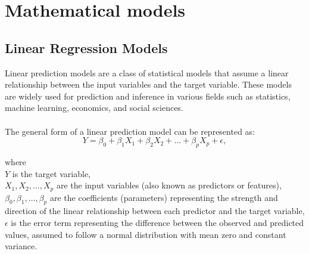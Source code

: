\documentclass[12pt]{article}
\begin{document}
\section{Mathematical models}

\subsection{Linear Regression Models}

Linear prediction models are a class of statistical models that assume
 a linear relationship between the input variables and the target
 variable. These models are widely used for prediction and inference
 in various fields such as statistics, machine learning,
 economics, and social sciences.\\
\\
The general form of a linear prediction model can be represented as:\\

\begin{equation}\label{eq1}
    Y = \beta_0 + \beta_1 X_1 + \beta_2 X_2 + \ldots + \beta_p X_p + \epsilon,
\end{equation}

\noindent where\\
\( Y \) is the target variable,\\
\( X_1, X_2, \ldots, X_p \) are the input variables (also known as predictors or features),\\
\( \beta_0, \beta_1, \ldots, \beta_p \) are the coefficients (parameters) representing the strength and direction of the linear relationship between each predictor and the target variable,\\
\( \epsilon \) is the error term representing the difference between the observed and predicted values, assumed to follow a normal distribution with mean zero and constant variance.\\
\end{document}
